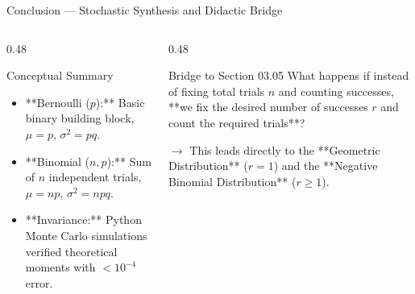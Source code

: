 \documentclass[aspectratio=169,xcolor={dvipsnames,table}]{beamer}
\begin{document}
\begin{frame}{Conclusion --- Stochastic Synthesis and Didactic Bridge}
	\begin{columns}[T]
		\begin{column}{0.48\textwidth}
			\begin{block}{Conceptual Summary}
				\small
				\begin{itemize}
					\itemsep=0.08cm
					\item **Bernoulli ($p$):** Basic binary building block, $\mu = p$, $\sigma^2 = pq$.
					\item **Binomial ($n, p$):** Sum of $n$ independent trials, $\mu = np$, $\sigma^2 = npq$.
					\item **Invariance:** Python Monte Carlo simulations verified theoretical moments with $< 10^{-4}$ error.
				\end{itemize}
			\end{block}
		\end{column}
		\begin{column}{0.48\textwidth}
			\begin{alertblock}{Bridge to Section 03.05}
				\small
				What happens if instead of fixing total trials $n$ and counting successes, **we fix the desired number of successes $r$ and count the required trials**?
				
				$\to$ This leads directly to the **Geometric Distribution** ($r=1$) and the **Negative Binomial Distribution** ($r \ge 1$).
			\end{alertblock}
		\end{column}
	\end{columns}
\end{frame}
\end{document}
